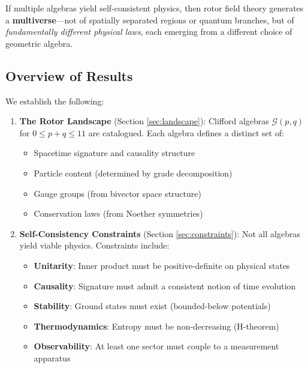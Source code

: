 \documentclass[11pt,a4paper]{article}
\numberwithin{equation}{section}
\theoremstyle{plain}
\theoremstyle{definition}
\theoremstyle{remark}
\newcommand{\Cl}{\mathcal{G}}               %
\begin{document}
If multiple algebras yield self-consistent physics, then rotor field theory generates a \textbf{multiverse}—not of spatially separated regions or quantum branches, but of \emph{fundamentally different physical laws}, each emerging from a different choice of geometric algebra.

\subsection{Overview of Results}

We establish the following:

\begin{enumerate}
\item \textbf{The Rotor Landscape} (Section \ref{sec:landscape}): Clifford algebras $\Cl(p,q)$ for $0 \leq p+q \leq 11$ are catalogued. Each algebra defines a distinct set of:
\begin{itemize}
\item Spacetime signature and causality structure
\item Particle content (determined by grade decomposition)
\item Gauge groups (from bivector space structure)
\item Conservation laws (from Noether symmetries)
\end{itemize}

\item \textbf{Self-Consistency Constraints} (Section \ref{sec:constraints}): Not all algebras yield viable physics. Constraints include:
\begin{itemize}
\item \textbf{Unitarity}: Inner product must be positive-definite on physical states
\item \textbf{Causality}: Signature must admit a consistent notion of time evolution
\item \textbf{Stability}: Ground states must exist (bounded-below potentials)
\item \textbf{Thermodynamics}: Entropy must be non-decreasing (H-theorem)
\item \textbf{Observability}: At least one sector must couple to a measurement apparatus
\end{itemize}


\end{enumerate}
\end{document}
